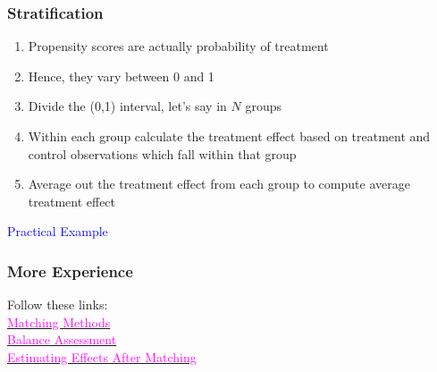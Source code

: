 \documentclass{beamer}
\theoremstyle{plain}
\begin{document}
\begin{frame}
	\frametitle{Stratification}
	\begin{enumerate}
		\item Propensity scores are actually probability of treatment
		\item Hence, they vary between 0 and 1
		\item Divide the (0,1) interval, let's say in $N$ groups
		\item Within each group calculate the treatment effect based on treatment and control observations which fall within that group
		\item Average out the treatment effect from each group to compute average treatment effect
	\end{enumerate}
\end{frame}

\begin{frame}
	\begin{center}
		\Large\textcolor{blue}{Practical Example}
	\end{center}
\end{frame}


\begin{frame}
	\frametitle{More Experience}
	
	Follow these links:\\
	\href{https://cran.r-project.org/web/packages/MatchIt/vignettes/matching-methods.html}{\textcolor{magenta}{Matching Methods}}\\
	\href{https://kosukeimai.github.io/MatchIt/articles/assessing-balance.html}{\textcolor{magenta}{Balance Assessment}}\\
	\href{https://kosukeimai.github.io/MatchIt/articles/estimating-effects.html}{\textcolor{magenta}{Estimating Effects After Matching}}\\
	
	
\end{frame}
\end{document}
